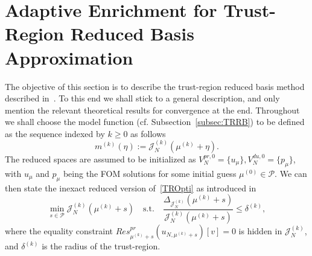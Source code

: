 \section{Adaptive Enrichment for Trust-Region Reduced Basis Approximation}\label{sec:AdapTRRBAlg}

The objective of this section is to describe the trust-region reduced basis method described in~\cite[Section 4]{Keil2021}.
To this end we shall stick to a general description, and only mention the relevant theoretical results for convergence at the end.
Throughout we shall choose the model function (cf. Subsection~\ref{subsec:TRRB}) to be defined as the sequence indexed by $k \geq 0$ as follows
\begin{equation*}\label{TRModelFunc}
    m^{(k)}(\eta) := \mathcal{J}_N^{(k)}(\mu^{(k)} + \eta).
\end{equation*}
The reduced spaces are assumed to be initialized as $V_N^{pr, 0} = \{ u_\mu \}, V_N^{du, 0} = \{ p_\mu \}$, with $u_\mu$ and $p_\mu$ being the FOM solutions for some initial guess $\mu^{(0)} \in \mathcal{P}$.
We can then state the inexact reduced version of~\eqref{TROpti} as introduced in~\cite[Equation 51]{Qian2017}
\begin{equation}\label{TRInexactOpti}
    \min\limits_{s \in \mathcal{P}} \mathcal{J}_N^{(k)}(\mu^{(k)} + s) \quad \text{s.t.} \quad \frac{\Delta_{\mathcal{J}_N^{(k)}}(\mu^{(k)} + s)}{\mathcal{J}_N^{(k)}(\mu^{(k)} + s)} \leq \delta^{(k)},
\end{equation}
where the equality constraint $Res_{\mu^{(k)} + s}^{pr} (u_{N, \mu^{(k)} + s})[v] = 0$ is hidden in $\mathcal{J}_N^{(k)}$, and $\delta^{(k)}$ is the radius of the trust-region.

